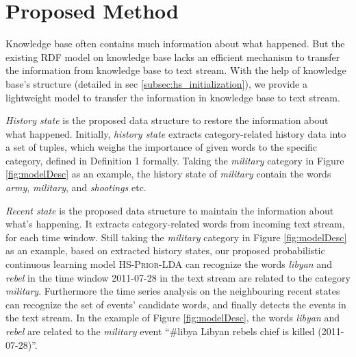 \documentclass[runningheads,a4paper]{llncs}
\begin{document}

\section{Proposed Method}
Knowledge base often contains much information about what happened. 
But the existing RDF model\cite{klyne2006rdf} on knowledge base lacks an efficient mechanism to transfer the information from knowledge base to text stream.  
With the help of knowledge base's structure (detailed in sec \ref{subsec:hs_initialization}), we provide a  lightweight model to transfer the information in knowledge base to text stream.

\textit{History state} is the proposed data structure to restore the information about what happened. 
Initially, \textit{history state} extracts category-related history data into a set of tuples, which weighs the importance of given words to the specific category, defined in Definition 1 formally. 
Taking the \textit{military} category in Figure \ref{fig:modelDesc} as an example, the history state of \textit{military} contain the words \textit{army}, \textit{military}, and \textit{shootings} etc. 

\textit{Recent state} is the proposed data structure to maintain the information about what's happening.
It extracts category-related words from incoming text stream, for each time window.
Still taking the \textit{military} category in  Figure \ref{fig:modelDesc} as an example, based on extracted history states, our proposed probabilistic continuous learning model \textsc{HS-Prior-LDA} can recognize the words \textit{libyan} and \textit{rebel} in the time window 2011-07-28 in the text stream are related to the category \textit{military}. 
Furthermore the time series analysis on the neighbouring recent states can recognize the set of events' candidate words, and finally detects the events in the text stream. 
In the example of Figure \ref{fig:modelDesc}, the words \textit{libyan} and \textit{rebel} are related to the \textit{military} event ``\#libya Libyan rebels chief is killed (2011-07-28)''.
\end{document}

